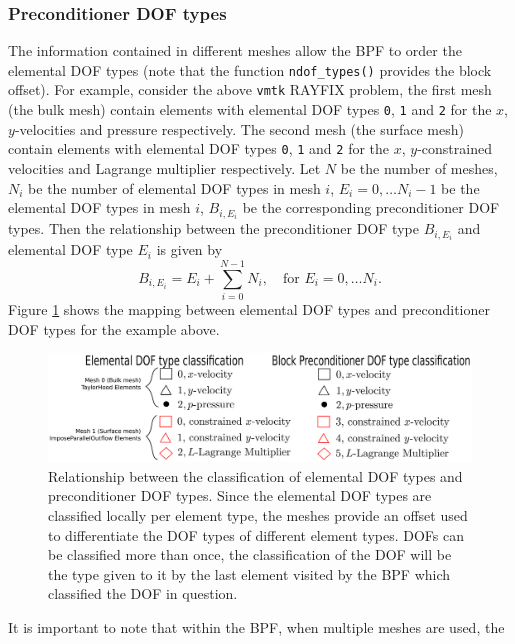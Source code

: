 \subsubsection{Preconditioner DOF types}
The information contained in different meshes allow the BPF to order the elemental
DOF types (note that the function \texttt{ndof\_\allowbreak types()} provides 
the block offset). For example, consider the above \texttt{vmtk} RAYFIX problem, 
the first mesh (the bulk mesh) contain elements with elemental DOF types 
\texttt{0}, \texttt{1} and \texttt{2} for the $x$, $y$-velocities and pressure
respectively. The second mesh (the surface mesh) contain elements with elemental
DOF types \texttt{0}, \texttt{1} and \texttt{2} for the $x$, $y$-constrained 
velocities and Lagrange multiplier respectively. Let $N$ be the 
number of meshes, $N_i$ be the number of elemental DOF types in mesh $i$,
$E_i = 0, \ldots N_i - 1$ be the elemental DOF types in mesh $i$, $B_{i,E_i}$ 
be the corresponding preconditioner DOF types. Then the relationship 
between the preconditioner DOF type $B_{i,E_i}$ and elemental DOF type
$E_i$ is given by
\begin{equation*}
  B_{i,E_i} = E_i + \sum_{i=0}^{N - 1} N_i, \quad \mbox{for } E_i = 0,\ldots N_i.
\end{equation*}
Figure \ref{fig:elemental_to_block_dof_classification} shows the mapping between
elemental DOF types and preconditioner DOF types for the example above.
\begin{figure}[H]
\centering
\includegraphics[width=1\textwidth]{./pic/elemental_to_block_dof_classification.pdf}
\caption{Relationship between the classification of elemental DOF types and
  preconditioner DOF types. Since the elemental DOF types are classified
  locally per element type, the meshes provide an offset used to differentiate
  the DOF types of different element types. DOFs can be classified more than
  once, the classification of the DOF will be the type given to it by the last
  element visited by the BPF which classified the DOF in question.}
\label{fig:elemental_to_block_dof_classification}
\end{figure}
It is important to note that within the BPF, when multiple meshes are used, the
